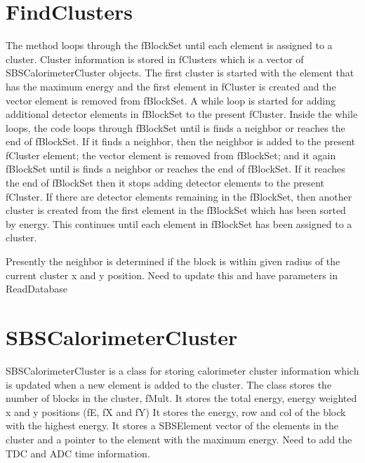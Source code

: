 \documentclass[11pt]{article}
\begin{document}
\section{FindClusters}
The method loops through the fBlockSet until each element is assigned to a cluster.
Cluster information is stored in fClusters which is a vector of SBSCalorimeterCluster objects.
The first cluster is started with the element that has the maximum energy and the first
element in fCluster is created and the vector element is removed from fBlockSet.
A while loop is started for adding additional detector elements in fBlockSet to the present fCluster.
Inside the while loops, the code loops through fBlockSet until is finds a neighbor or 
reaches the end of fBlockSet.
If it finds a neighbor, then the neighbor is added to the present fCluster element; 
the vector element is removed from fBlockSet; and it again fBlockSet until is finds a neighbor or 
reaches the end of fBlockSet.
If it reaches the end of  fBlockSet then it stops adding detector elements to the present fCluster.
If there are detector elements remaining in the fBlockSet, then another cluster is created from the
first element in the fBlockSet which has been sorted by energy. 
 This continues until  each element in fBlockSet has been assigned to a cluster.
 
 Presently the neighbor is determined if the block is within given radius of the current cluster x and y
 position. {\color{red} Need to update this and have parameters in ReadDatabase}
 
 \section{SBSCalorimeterCluster}
 SBSCalorimeterCluster is a class for storing calorimeter cluster information which is updated 
 when a new element is added to the cluster.
 The class stores the number of blocks in the cluster, fMult. It stores the total energy, energy weighted x
 and y positions (fE, fX and fY)  
 It stores the energy, row and col of the block with the highest energy.
 It stores a SBSElement vector of the elements in the cluster and a pointer to the element with the maximum energy.
 {\color{red} Need to add the TDC and ADC time information. } 
 
 
\end{document}
